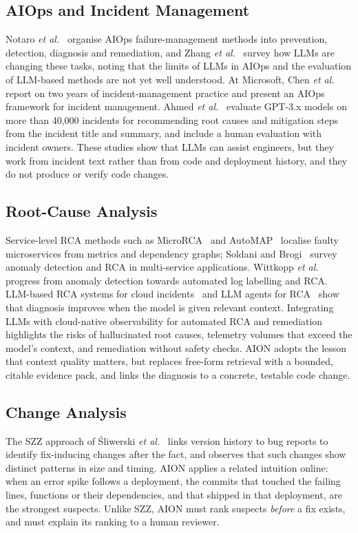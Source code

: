 \documentclass[conference]{IEEEtran}
\begin{document}
\subsection{AIOps and Incident Management}
Notaro \emph{et al.}~\cite{notaro2021survey} organise AIOps failure-management methods into prevention, detection, diagnosis and remediation, and Zhang \emph{et al.}~\cite{zhang2026aiopsllm} survey how LLMs are changing these tasks, noting that the limits of LLMs in AIOps and the evaluation of LLM-based methods are not yet well understood. At Microsoft, Chen \emph{et al.}~\cite{chen2020icm} report on two years of incident-management practice and present an AIOps framework for incident management. Ahmed \emph{et al.}~\cite{ahmed2023recommending} evaluate GPT-3.x models on more than 40,000 incidents for recommending root causes and mitigation steps from the incident title and summary, and include a human evaluation with incident owners. These studies show that LLMs can assist engineers, but they work from incident text rather than from code and deployment history, and they do not produce or verify code changes.

\subsection{Root-Cause Analysis}
Service-level RCA methods such as MicroRCA~\cite{wu2020microrca} and AutoMAP~\cite{ma2020automap} localise faulty microservices from metrics and dependency graphs; Soldani and Brogi~\cite{soldani2022survey} survey anomaly detection and RCA in multi-service applications. Wittkopp \emph{et al.}~\cite{wittkopp2023progressing} progress from anomaly detection towards automated log labelling and RCA. LLM-based RCA systems for cloud incidents~\cite{chen2024rcacopilot} and LLM agents for RCA~\cite{roy2024exploring} show that diagnosis improves when the model is given relevant context. Integrating LLMs with cloud-native observability for automated RCA and remediation~\cite{integrating2025llmobs} highlights the risks of hallucinated root causes, telemetry volumes that exceed the model's context, and remediation without safety checks. AION adopts the lesson that context quality matters, but replaces free-form retrieval with a bounded, citable evidence pack, and links the diagnosis to a concrete, testable code change.

\subsection{Change Analysis}
The SZZ approach of \'Sliwerski \emph{et al.}~\cite{sliwerski2005changes} links version history to bug reports to identify fix-inducing changes after the fact, and observes that such changes show distinct patterns in size and timing. AION applies a related intuition online: when an error spike follows a deployment, the commits that touched the failing lines, functions or their dependencies, and that shipped in that deployment, are the strongest suspects. Unlike SZZ, AION must rank suspects \emph{before} a fix exists, and must explain its ranking to a human reviewer.
\end{document}
